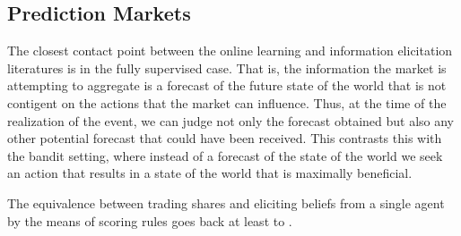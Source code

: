 


\subsection{Prediction Markets} 

The closest contact point between the online learning and information elicitation literatures is in the fully supervised case.
That is, the information the market is attempting to aggregate is a forecast of the future state of the world that is not contigent on the actions that the market can influence. Thus, at the time of the realization of the event, we can judge not only the forecast obtained but also any other potential forecast that could have been received. 
This contrasts this with the bandit setting, where instead of a forecast of the state of the world we seek an action that results in a state of the world that is maximally beneficial.


The equivalence between trading shares and eliciting beliefs from a single agent by the means of scoring rules goes back at least to \cite{savage1971elicitation}. 



